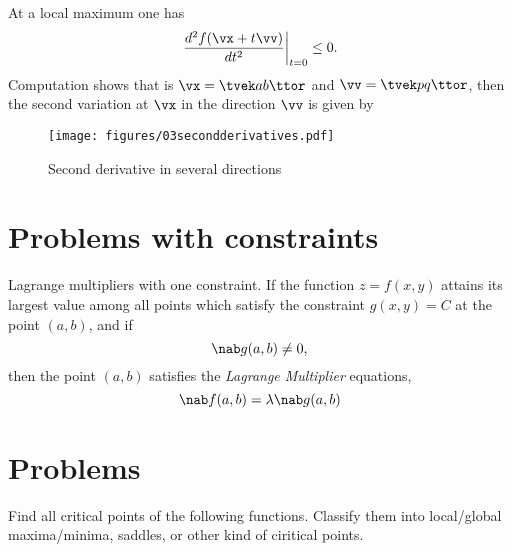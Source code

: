 At a local maximum one has
\[
\left.\frac{d^2 f(\vx+t\vv)}{dt^2}\right|_{t=0} \leq 0.
\]
Computation shows that is $\vx=\tvek a\\b\ttor$ and $\vv = \tvek p \\
q\ttor$, then the second variation at $\vx$ in the direction $\vv$ is given
by
\begin{equation}
  \label{eq:second-variation} 
\end{equation}

\begin{figure}[htb]
    \texttt{[image: figures/03secondderivatives.pdf]}
    \caption{ Second derivative in several directions}
    \label{fig:03second-derivatives}
\end{figure}

\section{Problems with constraints} Lagrange multipliers with one  %
constraint.  If the function $z=f(x, y)$ attains its largest value among
all points which satisfy the constraint $g(x, y) = C$ at the point $(a,
b)$, and if
\begin{equation}
  \nab g(a,b) \neq 0 ,
\end{equation}
then the point $(a, b)$ satisfies the \textit{Lagrange Multiplier}
equations,
\begin{equation}
  \nab f(a, b) = \lambda \nab g(a, b)
  \label{eq:Lagrange-multiplier} 
\end{equation}


\section{Problems}\small\sffamily %


\problem\label{pblm:find-critical-points}
Find all critical points of the following functions.  
Classify them into local/global maxima/minima, saddles, or other kind
of ciritical points.

